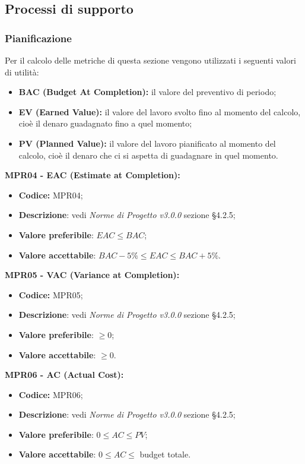 \subsection{Processi di supporto}
\subsubsection{Pianificazione}
Per il calcolo delle metriche di questa sezione vengono utilizzati i seguenti valori di utilità:
\begin{itemize}
    \item \textbf{BAC (Budget At Completion):} il valore del preventivo di periodo;
    \item \textbf{EV (Earned Value):}  il valore del lavoro svolto fino al momento del calcolo, cioè il denaro guadagnato fino a quel momento;
    \item \textbf{PV (Planned Value):} il valore del lavoro pianificato al momento del calcolo, cioè il denaro che ci si aspetta di guadagnare in quel momento.
\end{itemize}
\textbf{MPR04 - EAC (Estimate at Completion):}
\begin{itemize}
    \item \textbf{Codice:} MPR04;
    \item \textbf{Descrizione}: vedi \textit{Norme di Progetto v3.0.0} sezione \S 4.2.5;
    \item \textbf{Valore preferibile}: $EAC \leq BAC$;
    \item \textbf{Valore accettabile}: $BAC -5\% \leq EAC \leq BAC +5\%.$
\end{itemize}
\textbf{MPR05 - VAC (Variance at Completion):}
\begin{itemize}
    \item \textbf{Codice:} MPR05;
    \item \textbf{Descrizione}: vedi \textit{Norme di Progetto v3.0.0} sezione \S 4.2.5;
    \item \textbf{Valore preferibile}: $\geq 0$;
    \item \textbf{Valore accettabile}: $\geq 0$.
\end{itemize}
\textbf{MPR06 - AC (Actual Cost):}
\begin{itemize}
    \item \textbf{Codice:} MPR06;
    \item \textbf{Descrizione}: vedi \textit{Norme di Progetto v3.0.0} sezione \S 4.2.5;
    \item \textbf{Valore preferibile}: $0 \leq AC \leq PV$;
    \item \textbf{Valore accettabile}: $0 \leq AC \leq$ budget totale.
\end{itemize}
